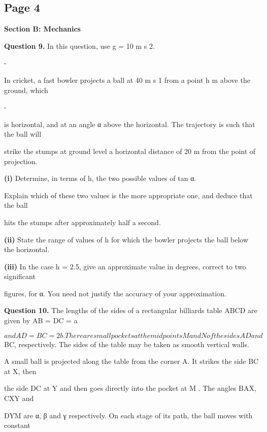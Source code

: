 \documentclass[12pt]{article}
\begin{document}
\subsection*{Page 4}
\begin{flushleft}
\bigskip\textbf{Section B: Mechanics}\par
\bigskip\textbf{Question 9.} In this question, use g = 10 m s 2.\par
-\par
In cricket, a fast bowler projects a ball at 40 m s 1 from a point h m above the ground, which\par
-\par
is horizontal, and at an angle α above the horizontal. The trajectory is such that the ball will\par
strike the stumps at ground level a horizontal distance of 20 m from the point of projection.\par
\textbf{(i)} Determine, in terms of h, the two possible values of tan α.\par
Explain which of these two values is the more appropriate one, and deduce that the ball\par
hits the stumps after approximately half a second.\par
\textbf{(ii)} State the range of values of h for which the bowler projects the ball below the horizontal.\par
\textbf{(iii)} In the case h = 2.5, give an approximate value in degrees, correct to two significant\par
figures, for α. You need not justify the accuracy of your approximation.\par
[You may use the small-angle approximations cos θ 1 and sin θ θ.]\par
\approx \approx\par
\bigskip\textbf{Question 10.} The lengths of the sides of a rectangular billiards table ABCD are given by AB = DC = a\par
\[and AD = BC = 2b. There are small pockets at the midpoints M and N of the sides AD and\]
BC, respectively. The sides of the table may be taken as smooth vertical walls.\par
A small ball is projected along the table from the corner A. It strikes the side BC at X, then\par
the side DC at Y and then goes directly into the pocket at M . The angles BAX, CXY and\par
DYM are α, β and γ respectively. On each stage of its path, the ball moves with constant\par

\end{flushleft}
\end{document}
